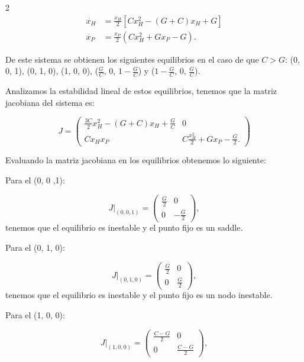 \documentclass[spanish, 12pt, a4paper]{article}
\begin{document}
\begin{multicols}{2}
\begin{align}
    \dot{x_H} &= \frac{x_H}{2} \left[ C x_H^2 - \left(G + C\right) x_H + G \right]\\
    \dot{x_P} &= \frac{x_P}{2} \left(C x_H^2 + G x_P - G\right).
\end{align}

De este sistema se obtienen los siguientes equilibrios en el caso de que $C > G$: (0, 0, 1), (0, 1, 0), (1, 0, 0), ($\frac{G}{C}$, 0, $1 - \frac{G}{C}$) y ($1 - \frac{G}{C}$, 0, $\frac{G}{C}$). 

Analizamos la estabilidad lineal de estos equilibrios, tenemos que la matriz jacobiana del sistema es:

\begin{equation}
    J = \begin{pmatrix}
        \frac{3C}{2} x_H^2 - \left(G + C\right) x_H + \frac{G}{C} & 0 \\
        Cx_H x_P & C \frac{x_H^2}{2} + G x_P - \frac{G}{2}.
    \end{pmatrix}
\end{equation}

Evaluando la matriz jacobiana en los equilibrios obtenemos lo siguiente:

Para el (0, 0 ,1): 

\begin{equation*}
    J|_{(0, 0, 1)} = \begin{pmatrix}
        \frac{G}{2} & 0 \\
        0 & -\frac{G}{2}
        \end{pmatrix},
\end{equation*}
tenemos que el equilibrio es inestable y el punto fijo es un saddle.

Para el (0, 1, 0):

\begin{equation*}
    J|_{(0, 1, 0)} = \begin{pmatrix}
        \frac{G}{2} & 0 \\
        0 & \frac{G}{2}
        \end{pmatrix},
\end{equation*}
tenemos que el equilibrio es inestable y el punto fijo es un nodo inestable.

Para el (1, 0, 0):

\begin{equation*}
    J|_{(1, 0, 0)} = \begin{pmatrix}
        \frac{C - G}{2} & 0 \\
        0 & \frac{C - G}{2}
        \end{pmatrix},
\end{equation*}


\end{multicols}
\end{document}
